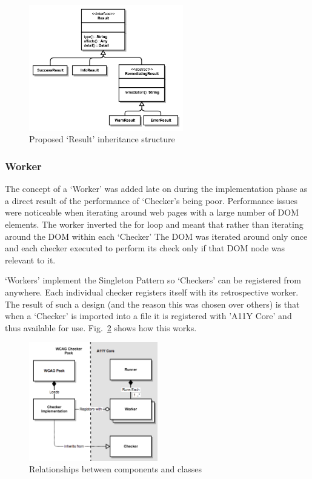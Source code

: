 \begin{figure}[H]
\centering
\includegraphics[width=0.6\textwidth]{figures/a11y_tool_result}
\captionsetup{justification=centering}
\caption{Proposed `Result' inheritance structure
\label{fig:result_design}}
\end{figure}

\subsubsection{Worker}
The concept of a `Worker' was added late on during the implementation phase as a
direct result of the performance of `Checker's being poor. Performance issues
were noticeable when iterating around web pages with a large number of DOM
elements. The worker inverted the for loop and meant that
rather than iterating around the DOM within each `Checker' The DOM was
iterated around only once and each checker executed to perform its check
only if that DOM node was relevant to it.

`Workers' implement the Singleton Pattern so `Checkers' can be registered from
anywhere. Each individual checker registers itself with its retrospective
worker. The result of such a design (and the reason this was chosen over others)
is that when a `Checker' is imported into a file it is registered with 'A11Y
Core' and thus available for use. Fig.~\ref{fig:a11y_tool_worker_design}
shows how this works.

\begin{figure}[H]
\centering
\includegraphics[width=0.5\textwidth]{figures/a11y_tool_worker_design}
\captionsetup{justification=centering}
\caption{Relationships between components and classes
\label{fig:a11y_tool_worker_design}}
\end{figure}

